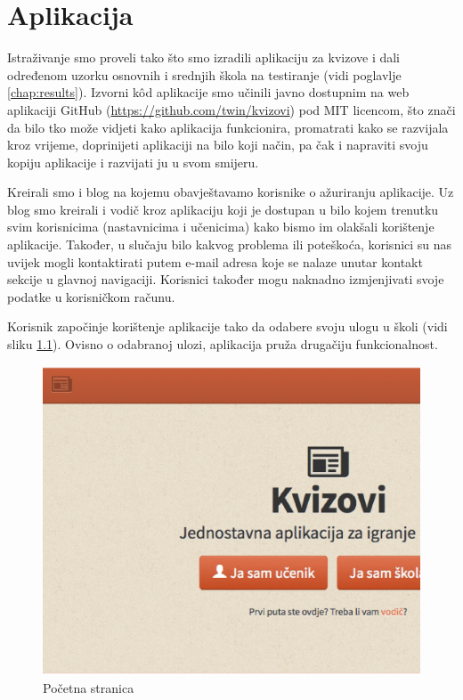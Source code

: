 \documentclass{scrreprt}
\begin{document}
\chapter{Aplikacija}

Istraživanje smo proveli tako što smo izradili aplikaciju za kvizove i dali
određenom uzorku osnovnih i srednjih škola na testiranje (vidi poglavlje
\ref{chap:results}). Izvorni kôd aplikacije smo učinili javno dostupnim na web
aplikaciji GitHub (\url{https://github.com/twin/kvizovi}) pod MIT licencom, što
znači da bilo tko može vidjeti kako aplikacija funkcionira, promatrati kako se
razvijala kroz vrijeme, doprinijeti aplikaciji na bilo koji način, pa čak i
napraviti svoju kopiju aplikacije i razvijati ju u svom
smijeru.\cite{github,mit}

Kreirali smo i blog na kojemu obavještavamo korisnike o ažuriranju aplikacije.
Uz blog smo kreirali i vodič kroz aplikaciju koji je dostupan u bilo kojem
trenutku svim korisnicima (nastavnicima i učenicima) kako bismo im olakšali
korištenje aplikacije. Također, u slučaju bilo kakvog problema ili poteškoća,
korisnici su nas uvijek mogli kontaktirati putem e-mail adresa koje se nalaze
unutar kontakt sekcije u glavnoj navigaciji. Korisnici također mogu naknadno
izmjenjivati svoje podatke u korisničkom računu.

Korisnik započinje korištenje aplikacije tako da odabere svoju ulogu u školi
(vidi sliku \ref{fig:home}). Ovisno o odabranoj ulozi, aplikacija pruža drugačiju
funkcionalnost.

\begin{figure}[H]
  \includegraphics[width=\textwidth, clip=true, trim=0 7cm 0 0, fbox]{home}
  \caption{Početna stranica}
  \label{fig:home}
\end{figure}
\end{document}
